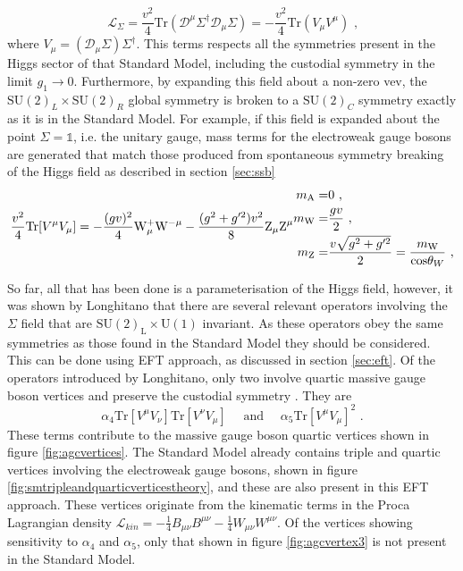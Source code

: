 %
\begin{equation}
\mathcal{L}_{\Sigma} = \frac{v^{2}}{4} \text{Tr} (\mathcal{D}^{\mu} \Sigma^{\dagger} \mathcal{D}_{\mu} \Sigma) = -\frac{v^{2}}{4}\text{Tr}(V_{\mu} V^{\mu}) \text{ ,} 
\end{equation}
%
\noindent where $V_{\mu} = (\mathcal{D}_{\mu}\Sigma) \Sigma^{\dagger}$.  This terms respects all the symmetries present in the Higgs sector of that Standard Model, including the custodial symmetry in the limit $g_{1} \rightarrow 0$.  Furthermore, by expanding this field about a non-zero vev, the $\text{SU}(2)_{L} \times \text{SU}(2)_{R}$ global symmetry is broken to a $\text{SU}(2)_{C}$ symmetry exactly as it is in the Standard Model.  For example, if this field is expanded about the point $\Sigma = \mathbb{1}$, i.e. the unitary gauge, mass terms for the electroweak gauge bosons are generated that match those produced from spontaneous symmetry breaking of the Higgs field as described in section \ref{sec:ssb}
%
\begin{equation}
\frac{v^{2}}{4}\text{Tr}[V^{\mu}V_{\mu}] = - \frac{(gv)^{2}}{4} \text{W}^{+}_{\mu} \text{W}^{-\mu} - \frac{(g^{2} + g'^{2})v^{2}}{8} \text{Z}_{\mu} \text{Z}^{\mu} \\
\begin{aligned}
m_{\text{A}} = & 0 \text{ ,} \\
m_{\text{W}} = & \frac{gv}{2} \text{ ,} \\
m_{\text{Z}} = & \frac{v\sqrt{g^{2} + g'^{2}}}{2} = \frac{m_{\text{W}}}{\text{cos}{\theta_{W}}} \text{ ,}
\end{aligned}
\end{equation}
%

So far, all that has been done is a parameterisation of the Higgs field, however, it was shown by Longhitano \cite{Longhitano:1980tm} that there are several relevant operators involving the $\Sigma$ field that are $\text{SU}(2)_{\text{L}} \times \text{U}(1)$ invariant.  As these operators obey the same symmetries as those found in the Standard Model they should be considered.  This can be done using EFT approach, as discussed in section \ref{sec:eft}.  Of the operators introduced by Longhitano, only two involve quartic massive gauge boson vertices and preserve the custodial symmetry \cite{Belyaev:1998ih}.  They are
%
\begin{equation}
\alpha_{4}\text{Tr}[V^{\mu}V_{\nu}]\text{Tr}[V^{\nu}V_{\mu}] \quad \text{ and } \quad \alpha_{5}\text{Tr}[V^{\mu}V_{\mu}]^{2} \text{ .}
\label{equ:newterms}
\end{equation}
%
\noindent These terms contribute to the massive gauge boson quartic vertices shown in figure \ref{fig:agcvertices}.  The Standard Model already contains triple and quartic vertices involving the electroweak gauge bosons, shown in figure \ref{fig:smtripleandquarticverticestheory}, and these are also present in this EFT approach.  These vertices originate from the kinematic terms in the Proca Lagrangian density $\mathcal{L}_{kin} = -\frac{1}{4}B_{\mu\nu}B^{\mu\nu} - \frac{1}{4}W_{\mu\nu}W^{\mu\nu}$.  Of the vertices showing sensitivity to $\alpha_{4}$ and $\alpha_{5}$, only that shown in figure \ref{fig:agcvertex3} is not present in the Standard Model.  

